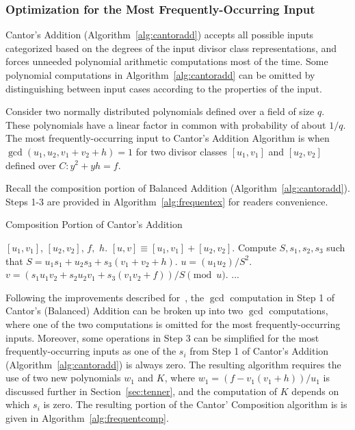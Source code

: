 \subsubsection{Optimization for the Most Frequently-Occurring Input}\label{sec:gcdoptimize} 
Cantor's Addition (Algorithm~\ref{alg:cantoradd}) accepts all possible inputs
categorized based on the degrees of the input divisor class representations, and
forces unneeded polynomial arithmetic computations most of the time. Some
polynomial computations in Algorithm~\ref{alg:cantoradd} can be omitted by
distinguishing between input cases according to the properties of the input.

Consider two normally distributed polynomials defined over a field of size $q$.
These polynomials  have a linear factor in common with probability of about
$1/q$. The most frequently-occurring input to Cantor's Addition Algorithm is
when $\gcd(u_1,u_2,v_1+v_2+h) = 1$ for two divisor classes $[u_1,v_1]$ and
$[u_2,v_2]$ defined over $C : y^2 + yh = f$. 

Recall the composition portion of Balanced Addition
(Algorithm~\ref{alg:cantoradd}). Steps 1-3 are provided in
Algorithm~\ref{alg:frequentex} for readers convenience.
\begin{center}
    \begin{minipage}{0.75\textwidth}
    \begin{algorithm}[H]\label{alg:frequentex}
        \caption{Composition Portion of Cantor's Addition}
        \centering
        \begin{algorithmic}[1]
            \Require $[u_1,v_1]$, $[u_2,v_2]$, $f,$ $h.$
            \Ensure $[u,v] \equiv [u_1,v_1] + [u_2,v_2]$.
            \vspace{5pt}
            \State Compute $S,s_1,s_2,s_3$ such that $S = u_1s_1 +
            u_2s_3 + s_3(v_1 + v_2 + h)$. 
            \State $u = (u_1u_2)/S^2$. 
            \State $v = (s_1u_1v_2 + s_2u_2v_1 + s_3(v_1v_2 + f))/S \pmod{u}$.
            \vspace{-6pt}
            \Statex ...
            \vspace{1pt}
        \end{algorithmic}
    \end{algorithm}
    \end{minipage}
\end{center}
Following the improvements described for~\cite[Algorithm~1]{ImbJac13:amc}, the
$\gcd$ computation in Step 1 of Cantor's (Balanced) Addition can be broken up
into two $\gcd$ computations, where one of the two computations is omitted for
the most frequently-occurring inputs. Moreover, some operations in Step 3 can be
simplified for the most frequently-occurring inputs as one of the $s_i$ from
Step 1 of Cantor's Addition (Algorithm~\ref{alg:cantoradd}) is always zero. The
resulting algorithm requires the use of two new polynomials $w_1$ and $K$, where
$w_1 = (f - v_1(v_1 + h))/u_1$ is discussed further in Section~\ref{sec:tenner},
and the computation of $K$ depends on which $s_i$ is zero. The resulting portion
of the Cantor' Composition algorithm is is given in Algorithm~\ref{alg:frequentcomp}.


